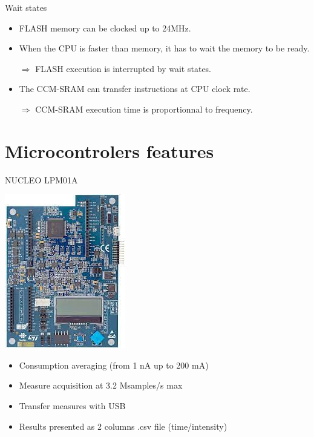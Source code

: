 \documentclass[
	11pt, %
]{beamer}
\begin{document}
\begin{frame}{Wait states}
	\begin{itemize}
	\item FLASH memory can be clocked up to 24MHz.
	\item When the CPU is faster than memory, it has to wait the memory to be ready.
	
	$\Rightarrow$ FLASH execution is interrupted by wait states. 
	\item The CCM-SRAM can transfer instructions at CPU clock rate.
	
	$\Rightarrow$ CCM-SRAM execution time is proportionnal to frequency. 
	\end{itemize} 
\end{frame}

\section{Microcontrolers features}

\begin{frame}{NUCLEO LPM01A}
	\centering
    \begin{minipage}{0.4\textwidth}
		\includegraphics[scale = 0.5]{images/lpm01a.jpeg}
	\end{minipage}
	\begin{minipage}{0.50\textwidth}
		\centering
		\begin{itemize}
			\item Consumption averaging (from 1 nA up to 200 mA)
			\item Measure acquisition at 3.2 Msamples/s max
			\item Transfer measures with USB
			\item Results presented as 2 columns .csv file (time/intensity)
		\end{itemize}
		\end{minipage}
\end{frame}
\end{document}
